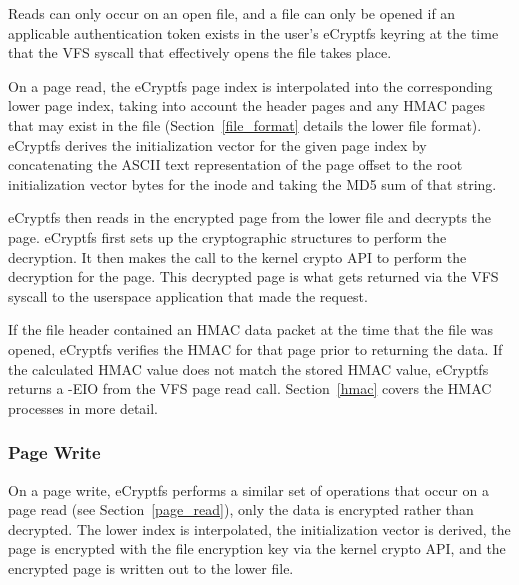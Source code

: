 \documentclass{article}
\begin{document}
\label{page_read}

Reads can only occur on an open file, and a file can only be opened if
an applicable authentication token exists in the user's eCryptfs
keyring at the time that the VFS syscall that effectively opens the
file takes place.

On a page read, 
the eCryptfs page index is interpolated into the corresponding lower
page index, taking into account the header pages and any HMAC pages
that may exist in the file (Section~\ref{file_format} details the
lower file format).
eCryptfs derives the initialization vector for the given page index
by concatenating the ASCII text representation of the page offset to
the root initialization vector bytes for the inode and taking the MD5
sum of that string.

eCryptfs then reads in the encrypted page from the lower file and
decrypts the page. 
eCryptfs first sets up the cryptographic structures to perform the
decryption.
It then makes the call to the kernel crypto API to perform the
decryption for the page.
This decrypted page is what gets returned via the VFS syscall to the
userspace application that made the request.

If the file header contained an HMAC data packet at the time that the
file was opened, eCryptfs verifies the HMAC for that page prior to
returning the data. If the calculated HMAC value does not match the
stored HMAC value, eCryptfs returns a -EIO from the VFS page read
call. Section~\ref{hmac} covers the HMAC processes in more detail.

\subsubsection{Page Write}

On a page write, 
eCryptfs performs a similar set of operations that occur on a page
read (see Section~\ref{page_read}), only the data is encrypted rather
than decrypted. The lower index is interpolated, the initialization
vector is derived, the page is encrypted with the file encryption key via the
kernel crypto API, and the encrypted page is written out to the lower
file.
\end{document}
